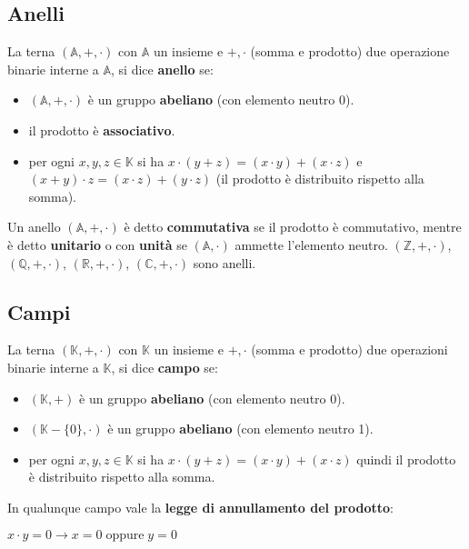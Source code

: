 \subsection{Anelli}
La terna $(\mathbb{A}, +, \cdot)$ con $\mathbb{A}$ un insieme e $+, \cdot$ (somma e prodotto) due operazione binarie interne a $\mathbb{A}$, si dice \textbf{anello} se:
\begin{itemize}[nosep]
    \item $(\mathbb{A}, +, \cdot)$ è un gruppo \textbf{abeliano} (con elemento neutro 0).
    \item il prodotto è \textbf{associativo}.
    \item per ogni $x,y,z \in \mathbb{K}$ si ha $x \cdot (y + z) = (x \cdot y) + (x \cdot z)$ e $(x + y) \cdot z = (x \cdot z) + (y \cdot z)$ (il prodotto è distribuito rispetto alla somma).
\end{itemize}
Un anello $(\mathbb{A}, +, \cdot)$ è detto \textbf{commutativa} se il prodotto è commutativo, mentre è detto \textbf{unitario} o con \textbf{unità} se $(\mathbb{A}, \cdot)$ ammette l'elemento neutro. $(\mathbb{Z}, +, \cdot)$, $(\mathbb{Q}, +, \cdot)$, $(\mathbb{R}, +, \cdot)$, $(\mathbb{C}, +, \cdot)$ sono anelli.

\subsection{Campi}
La terna $(\mathbb{K}, +, \cdot)$ con $\mathbb{K}$ un insieme e $+, \cdot$ (somma e prodotto) due operazioni binarie interne a $\mathbb{K}$, si dice \textbf{campo} se:
\begin{itemize}[nosep]
    \item $(\mathbb{K}, +)$ è un gruppo \textbf{abeliano} (con elemento neutro 0).
    \item $(\mathbb{K} - \{0\}, \cdot)$ è un gruppo \textbf{abeliano} (con elemento neutro 1).
    \item per ogni $x,y,z \in \mathbb{K}$ si ha $x \cdot (y + z) = (x \cdot y) + (x \cdot z)$ quindi il prodotto è distribuito rispetto alla somma.
\end{itemize}
In qualunque campo vale la \textbf{legge di annullamento del prodotto}:

{\centering
    $x \cdot y = 0 \rightarrow x = 0 \; \text{oppure} \; y = 0$
\par}

\newpage
